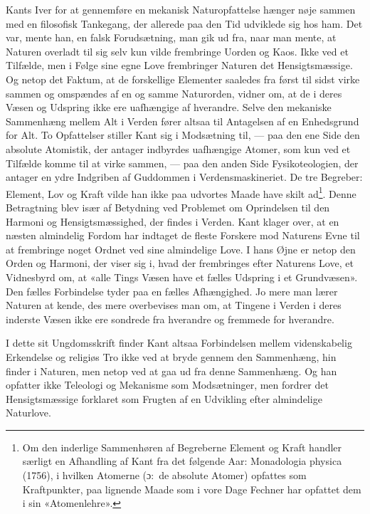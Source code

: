 \documentclass[12pt,a4paper]{article}
\newcommand{\apage}[1]{\marginnote{\footnotesize\textit{[#1]}}}
\begin{document}
Kants Iver for at gennemføre en mekanisk Naturopfattelse hænger nøje
sammen \apage{10}  med en filosofisk Tankegang, der allerede paa den Tid udviklede
sig hos ham. Det var, mente han, en falsk Forudsætning, man gik ud fra,
naar man mente, at Naturen overladt til sig selv kun vilde frembringe
Uorden og Kaos. Ikke ved et Tilfælde, men i Følge sine egne Love
frembringer Naturen det Hensigtsmæssige. Og netop det Faktum, at de
forskellige Elementer saaledes fra først til sidst virke sammen og
omspændes af en og samme Naturorden, vidner om, at de i deres Væsen og
Udspring ikke ere uafhængige af hverandre. Selve den mekaniske
Sammenhæng mellem Alt i Verden fører altsaa til Antagelsen af en
Enhedsgrund for Alt. To Opfattelser stiller Kant sig i Modsætning til,
--- paa den ene Side den absolute Atomistik, der antager indbyrdes
uafhængige Atomer, som kun ved et Tilfælde komme til at virke sammen, ---
paa den anden Side Fysikoteologien, der antager en ydre Indgriben af
Guddommen i Verdensmaskineriet. De tre Begreber: Element, Lov og Kraft
vilde han ikke paa udvortes Maade have skilt ad\footnote{Om den inderlige
Sammenhøren af Begreberne Element og Kraft handler særligt en Afhandling
af Kant fra det følgende Aar: Monadologia physica (1756), i
hvilken Atomerne (ɔ:\ de absolute Atomer) opfattes som Kraftpunkter, paa
lignende Maade som i vore Dage Fechner har opfattet dem i sin
«Atomenlehre».}. Denne Betragtning blev især af Betydning ved Problemet
om Oprindelsen til den Harmoni og Hensigtsmæssighed, der findes i Verden.
Kant klager over, at en næsten almindelig Fordom har indtaget de fleste
Forskere mod Naturens Evne til at frembringe noget Ordnet ved sine
almindelige Love. I hans Øjne er netop den Orden og Harmoni, der viser
sig i, hvad der frembringes efter Naturens Love, et Vidnesbyrd om, at
«alle Tings Væsen have et fælles Udspring i et Grundvæsen». Den fælles
Forbindelse tyder paa en fælles Afhængighed. Jo mere man lærer Naturen at
kende, des mere overbevises man om, at Tingene i Verden i deres inderste
Væsen ikke ere sondrede fra hverandre og fremmede for hverandre.

I dette sit Ungdomsskrift finder Kant altsaa Forbindelsen mellem
videnskabelig Erkendelse og religiøs Tro ikke ved at bryde gennem den
Sammenhæng, hin finder i Naturen, men netop ved at gaa ud fra denne
Sammenhæng. Og han opfatter ikke Teleologi og Mekanisme som Modsætninger,
men fordrer det Hensigtsmæssige forklaret som Frugten af en Udvikling
efter almindelige Naturlove.
\end{document}
